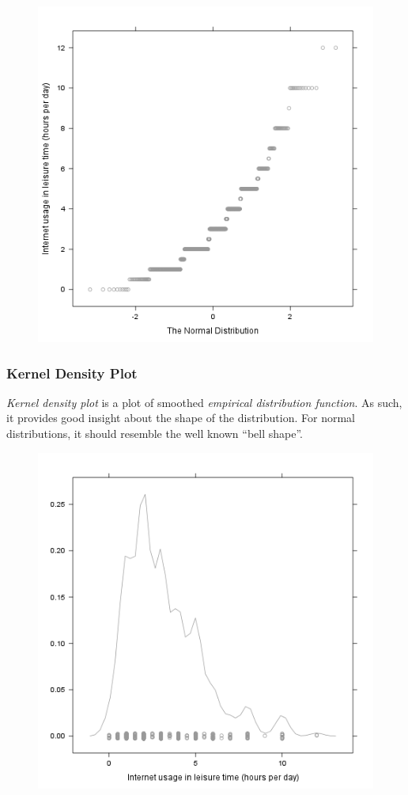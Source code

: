 \documentclass[]{article}
\makeatletter
\def\maxwidth{\ifdim\Gin@nat@width>\linewidth\linewidth
\else\Gin@nat@width\fi}
\let\Oldincludegraphics\includegraphics
\renewcommand{\includegraphics}[1]{\Oldincludegraphics[width=\maxwidth]{#1}}
\makeatother
\begin{document}
\begin{figure}[htbp]
\centering
\includegraphics{90c36448209c0d19b8b44a89277b29a3.png}
\caption{}
\end{figure}

\subsubsection{Kernel Density Plot}

\emph{Kernel density plot} is a plot of smoothed \emph{empirical
distribution function}. As such, it provides good insight about the
shape of the distribution. For normal distributions, it should resemble
the well known ``bell shape''.

\begin{figure}[htbp]
\centering
\includegraphics{d60f6bc4a500f7965efdd22587e4ed81.png}
\caption{}
\end{figure}
\end{document}
